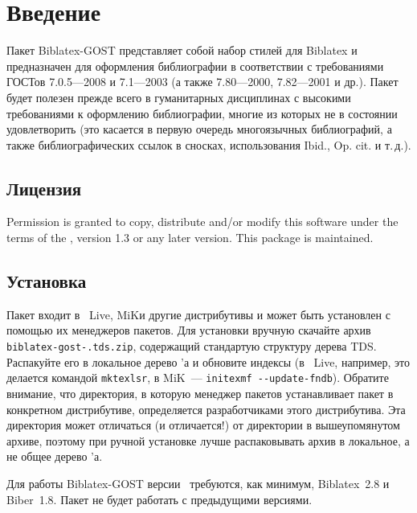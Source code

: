 \documentclass[10pt,a4paper,headings=small,numbers=enddot,english,russian]{ltxdockit}[2011/03/25]
\newcommand*{\biber}{Biber\xspace}
\newcommand*{\biblatex}{Biblatex\xspace}
\newcommand*{\biblatexgost}{Biblatex-GOST\xspace}
\begin{document}
\printtitlepage
\tableofcontents
\listoftables

\section{Введение}
\label{sec:int}

Пакет \biblatexgost{} представляет
собой набор стилей для \biblatex{}\unspace{}
и предназначен для оформления библиографии в соответствии с требованиями ГОСТов 7.0.5---2008 и
7.1---2003 (а также 7.80---2000, 7.82---2001 и др.). Пакет будет полезен прежде всего в
гуманитарных дисциплинах с высокими требованиями к оформлению библиографии, многие из
которых \bibtex не в состоянии удовлетворить (это касается в первую очередь многоязычных
библиографий, а также библиографических ссылок в сносках, использования Ibid., Op. cit. и т.\,д.).

\subsection{Лицензия}
\label{sec:lic}

Permission is granted to copy, distribute and\slash or modify this software under the
terms of the \lppl, version 1.3 or any later
version.
This package is
maintained.

\subsection{Установка}
\label{sec:install}

Пакет входит в \tex~Live, MiK\tex и другие дистрибутивы и может быть установлен
с помощью их менеджеров пакетов. Для установки вручную скачайте архив
\texttt{biblatex-gost-.tds.zip}, содержащий стандартую структуру дерева TDS.
Распакуйте его в локальное дерево \tex'а и
обновите индексы (в \tex~Live, например, это делается командой \texttt{mktexlsr},
в MiK\tex~--- \texttt{initexmf -{}-update-fndb}). Обратите внимание, что директория,
в которую менеджер пакетов устанавливает пакет в конкретном дистрибутиве,
определяется разработчиками этого дистрибутива.
Эта директория может отличаться (и отличается!) от директории
в вышеупомянутом архиве, поэтому при ручной установке лучше распаковывать
архив в локальное, а не общее дерево \tex'а.

Для работы \biblatexgost версии \makeatletter\bbx@gost@version\makeatother\
требуются, как минимум,
\biblatex~2.8
и \biber~1.8.
Пакет не будет работать с предыдущими версиями.
\end{document}
